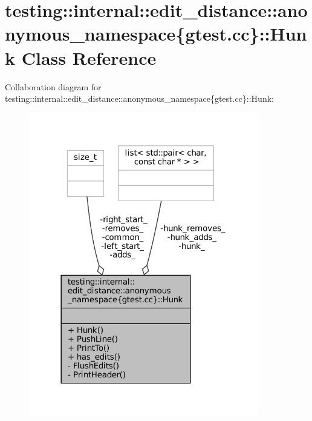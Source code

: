 \hypertarget{classtesting_1_1internal_1_1edit__distance_1_1anonymous__namespace_02gtest_8cc_03_1_1Hunk}{}\section{testing\+:\+:internal\+:\+:edit\+\_\+distance\+:\+:anonymous\+\_\+namespace\{gtest.\+cc\}\+:\+:Hunk Class Reference}
\label{classtesting_1_1internal_1_1edit__distance_1_1anonymous__namespace_02gtest_8cc_03_1_1Hunk}


Collaboration diagram for testing\+:\+:internal\+:\+:edit\+\_\+distance\+:\+:anonymous\+\_\+namespace\{gtest.\+cc\}\+:\+:Hunk\+:
\nopagebreak
\begin{figure}[H]
\begin{center}
\leavevmode
\includegraphics[width=285pt]{classtesting_1_1internal_1_1edit__distance_1_1anonymous__namespace_02gtest_8cc_03_1_1Hunk__coll__graph}
\end{center}
\end{figure}
